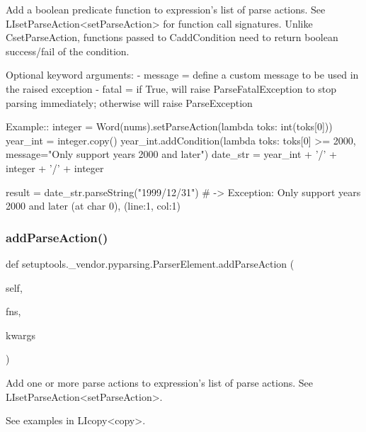 \begin{DoxyVerb}Add a boolean predicate function to expression's list of parse actions. See 
L{I{setParseAction}<setParseAction>} for function call signatures. Unlike C{setParseAction}, 
functions passed to C{addCondition} need to return boolean success/fail of the condition.

Optional keyword arguments:
 - message = define a custom message to be used in the raised exception
 - fatal   = if True, will raise ParseFatalException to stop parsing immediately; otherwise will raise ParseException
 
Example::
    integer = Word(nums).setParseAction(lambda toks: int(toks[0]))
    year_int = integer.copy()
    year_int.addCondition(lambda toks: toks[0] >= 2000, message="Only support years 2000 and later")
    date_str = year_int + '/' + integer + '/' + integer

    result = date_str.parseString("1999/12/31")  # -> Exception: Only support years 2000 and later (at char 0), (line:1, col:1)
\end{DoxyVerb}
 \mbox{\label{classsetuptools_1_1__vendor_1_1pyparsing_1_1ParserElement_a350ff60fb199c182d996530bc63166f5}} 
\subsubsection{\texorpdfstring{add\+Parse\+Action()}{addParseAction()}}
{\footnotesize\ttfamily def setuptools.\+\_\+vendor.\+pyparsing.\+Parser\+Element.\+add\+Parse\+Action (\begin{DoxyParamCaption}\item[{}]{self,  }\item[{}]{fns,  }\item[{}]{kwargs }\end{DoxyParamCaption})}

\begin{DoxyVerb}Add one or more parse actions to expression's list of parse actions. See L{I{setParseAction}<setParseAction>}.

See examples in L{I{copy}<copy>}.
\end{DoxyVerb}
 \mbox{\label{classsetuptools_1_1__vendor_1_1pyparsing_1_1ParserElement_ac88b6fc413a55ded2a2bc2c37c31561c}} 
